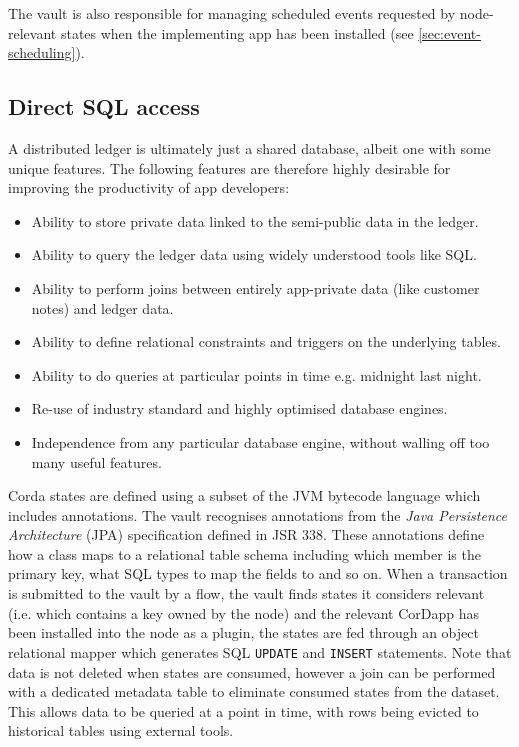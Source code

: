 \documentclass{article}
\begin{document}
The vault is also responsible for managing scheduled events requested by node-relevant states when the implementing app
has been installed (see \cref{sec:event-scheduling}).

\subsection{Direct SQL access}

A distributed ledger is ultimately just a shared database, albeit one with some unique features. The following features
are therefore highly desirable for improving the productivity of app developers:

\begin{itemize}
\item Ability to store private data linked to the semi-public data in the ledger.
\item Ability to query the ledger data using widely understood tools like SQL.
\item Ability to perform joins between entirely app-private data (like customer notes) and ledger data.
\item Ability to define relational constraints and triggers on the underlying tables.
\item Ability to do queries at particular points in time e.g. midnight last night.
\item Re-use of industry standard and highly optimised database engines.
\item Independence from any particular database engine, without walling off too many useful features.
\end{itemize}

Corda states are defined using a subset of the JVM bytecode language which includes annotations. The vault recognises
annotations from the \emph{Java Persistence Architecture} (JPA) specification defined in JSR 338\cite{JPA}.
These annotations define how a class maps to a relational table schema including which member is the primary key, what
SQL types to map the fields to and so on. When a transaction is submitted to the vault by a flow, the vault finds
states it considers relevant (i.e. which contains a key owned by the node) and the relevant CorDapp has been installed
into the node as a plugin, the states are fed through an object relational mapper which generates SQL \texttt{UPDATE}
and \texttt{INSERT} statements. Note that data is not deleted when states are consumed, however a join can be performed
with a dedicated metadata table to eliminate consumed states from the dataset. This allows data to be queried at a point
in time, with rows being evicted to historical tables using external tools.
\end{document}
